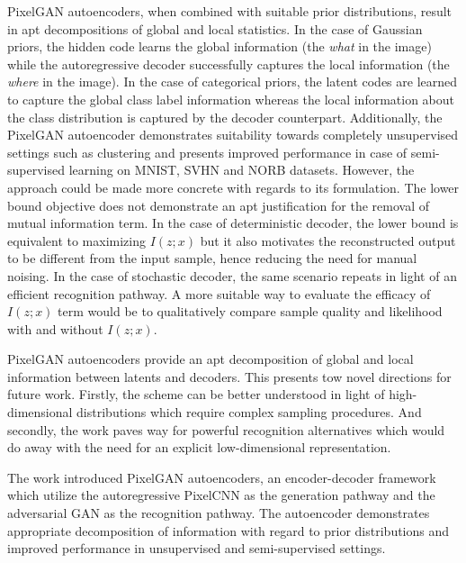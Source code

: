 \documentclass[11pt,letterpaper]{article}
\begin{document}
PixelGAN autoencoders, when combined with suitable prior distributions, result in apt decompositions of global and local statistics. In the case of Gaussian priors, the hidden code learns the global information (the \textit{what} in the image) while the autoregressive decoder successfully captures the local information (the \textit{where} in the image). In the case of categorical priors, the latent codes are learned to capture the global class label information whereas the local information about the class distribution is captured by the decoder counterpart. Additionally, the PixelGAN autoencoder demonstrates suitability towards completely unsupervised settings such as clustering and presents improved performance in case of semi-supervised learning on MNIST, SVHN and NORB datasets. However, the approach could be made more concrete with regards to its formulation. The lower bound objective does not demonstrate an apt justification for the removal of mutual information term. In the case of deterministic decoder, the lower bound is equivalent to maximizing $I(z;x)$ but it also motivates the reconstructed output to be different from the input sample, hence reducing the need for manual noising. In the case of stochastic decoder, the same scenario repeats in light of an efficient recognition pathway. A more suitable way to evaluate the efficacy of $I(z;x)$ term would be to qualitatively compare sample quality and likelihood with and without $I(z;x)$.

PixelGAN autoencoders provide an apt decomposition of global and local information between latents and decoders. This presents tow novel directions for future work. Firstly, the scheme can be better understood in light of high-dimensional distributions which require complex sampling procedures. And secondly, the work paves way for powerful recognition alternatives which would do away with the need for an explicit low-dimensional representation. 

The work introduced PixelGAN autoencoders, an encoder-decoder framework which utilize the autoregressive PixelCNN as the generation pathway and the adversarial GAN as the recognition pathway. The autoencoder demonstrates appropriate decomposition of information with regard to prior distributions and improved performance in unsupervised and semi-supervised settings. 
\end{document}
